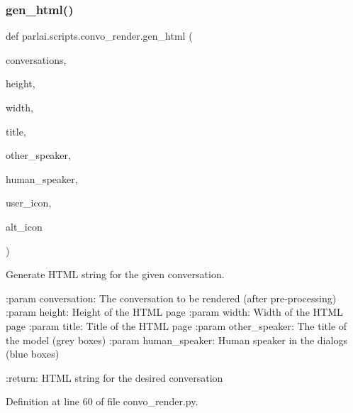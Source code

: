 \subsubsection{\texorpdfstring{gen\+\_\+html()}{gen\_html()}}
{\footnotesize\ttfamily def parlai.\+scripts.\+convo\+\_\+render.\+gen\+\_\+html (\begin{DoxyParamCaption}\item[{}]{conversations,  }\item[{}]{height,  }\item[{}]{width,  }\item[{}]{title,  }\item[{}]{other\+\_\+speaker,  }\item[{}]{human\+\_\+speaker,  }\item[{}]{user\+\_\+icon,  }\item[{}]{alt\+\_\+icon }\end{DoxyParamCaption})}

\begin{DoxyVerb}Generate HTML string for the given conversation.

:param conversation:
    The conversation to be rendered (after pre-processing)
:param height:
    Height of the HTML page
:param width:
    Width of the HTML page
:param title:
    Title of the HTML page
:param other_speaker:
    The title of the model (grey boxes)
:param human_speaker:
    Human speaker in the dialogs (blue boxes)

:return: HTML string for the desired conversation
\end{DoxyVerb}
 

Definition at line 60 of file convo\+\_\+render.\+py.


